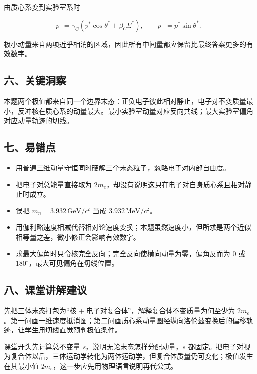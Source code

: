\documentclass[12pt,a4paper,UTF8]{ctexart}
\newcommand{\tightlist}{\setlength{\itemsep}{0pt}\setlength{\parskip}{0pt}}
\begin{document}
由质心系变到实验室系时

\[p_\parallel=\gamma_C(p^*\cos\theta^*+\beta_CE^*),
\qquad p_\perp=p^*\sin\theta^*.\]

极小动量来自两项近乎相消的区域，因此所有中间量都应保留比最终答案更多的有效数字。

\subsection{六、关键洞察}\label{ux516dux5173ux952eux6d1eux5bdf-7}

本题两个极值都来自同一个边界末态：正负电子彼此相对静止，电子对不变质量最小，反冲核在质心系的动量最大。最小实验室动量对应反向共线；最大实验室偏角对应动量轨迹的切线。

\subsection{七、易错点}\label{ux4e03ux6613ux9519ux70b9-7}

\begin{itemize}
\tightlist
\item
  用普通三维动量守恒同时硬解三个末态粒子，忽略电子对内部自由度。
\item
  把电子对总能量直接取为
  \(2m_e\)，却没有说明这只在电子对自身质心系且相对静止时成立。
\item
  误把 \(m_n=3.932\,\mathrm{GeV}/c^2\) 当成
  \(3.932\,\mathrm{MeV}/c^2\)。
\item
  用伽利略速度相减代替相对论速度变换；本题虽然速度小，但所求是两个近似相等量之差，微小修正会影响有效数字。
\item
  求最大偏角时只令核完全反向；完全反向使横向动量为零，偏角反而为 \(0\)
  或 \(180^\circ\)，最大可见偏角在切线位置。
\end{itemize}

\subsection{八、课堂讲解建议}\label{ux516bux8bfeux5802ux8bb2ux89e3ux5efaux8bae-7}

先把三体末态打包为``核 + 电子对复合体''，解释复合体不变质量为何至少为
\(2m_e\)。第一问画一维速度抵消图；第二问画质心系动量圆经纵向洛伦兹变换后的偏移轨迹，让学生用切线直觉预判极值条件。

课堂开头先计算总不变量 \(s\)，说明无论末态怎样分配动量，\(s\)
都固定。把电子对视为复合体以后，三体运动学转化为两体运动学，但复合体质量仍可变化；极值发生在其最小值
\(2m_e\)，这一步应先用物理语言说明再代公式。
\end{document}
